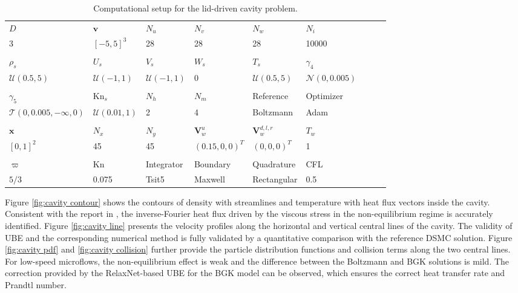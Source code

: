 \documentclass[preprint,3p,12pt,sort&compress]{elsarticle}
\begin{document}
\begin{table}[htbp]
	\caption{Computational setup for the lid-driven cavity problem.}
	\centering
	\begin{tabular}{lllllllll} 
	    \hline
	    $D$ & $\mathbf v$ & $N_u$ & $N_v$ & $N_w$ & $N_i$ & \\
	    3 & $[-5,5]^3$ & 28 & 28 & 28 & 10000 & \\
		\rule{0pt}{0ex}\\
		$\rho_s$ & $U_s$ & $V_s$ & $W_s$ & $T_s$ & $\gamma_4$ \\
		$\mathcal U(0.5,5)$ & $\mathcal U(-1,1)$ & $\mathcal U(-1,1)$ & $0$ & $\mathcal U(0.5,5)$ & $\mathcal N(0,0.005)$ \\
		\rule{0pt}{0ex}\\
		$\gamma_5$ & $\mathrm{Kn}_s$ & $N_h$ & $N_m$ & Reference & Optimizer \\
	    $\mathcal T(0,0.005,-\infty,0)$ & $\mathcal U(0.01,1)$ & 2 & 4 & Boltzmann & Adam \\
		\rule{0pt}{0ex}\\
	    $\mathbf x$ & $N_x$ & $N_y$ & $\mathbf V_w^{u}$ & $\mathbf V_w^{d,l,r}$ & $T_w$ \\
		$[0,1]^2$ & 45 & 45 & $(0.15,0,0)^T$ & $(0,0,0)^T$ & 1 \\
		\rule{0pt}{0ex}\\
		$\varpi$ & Kn & Integrator & Boundary & Quadrature & CFL \\
		$5/3$ & 0.075 & Tsit5 & Maxwell & Rectangular & 0.5 \\
		\hline
	\end{tabular} 
	\label{tab:cavity}
\end{table}

Figure \ref{fig:cavity contour} shows the contours of density with streamlines and temperature with heat flux vectors inside the cavity.
Consistent with the report in \cite{john2010investigation}, the  inverse-Fourier heat flux driven by the viscous stress in the non-equilibrium regime is accurately identified.
Figure \ref{fig:cavity line} presents the velocity profiles along the horizontal and vertical central lines of the cavity.
The validity of UBE and the corresponding numerical method is fully validated by a quantitative comparison with the reference DSMC solution.
Figure \ref{fig:cavity pdf} and \ref{fig:cavity collision} further provide the particle distribution functions and collision terms along the two central lines.
For low-speed microflows, the non-equilibrium effect is weak and the difference between the Boltzmann and BGK solutions is mild.
The correction provided by the RelaxNet-based UBE for the BGK model can be observed, which ensures the correct heat transfer rate and Prandtl number.
\end{document}
